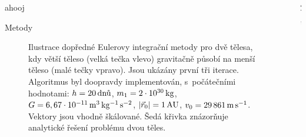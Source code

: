 \documentclass{beamer}
\newlength{\sep}
\newlength{\vyskaA}
\newlength{\side}
\begin{document}
\begin{frame}
\begin{columns}[t]
\begin{column}{\side}
	\vspace{\sep}

\begin{tcolorbox}
ahooj
\end{tcolorbox}
	\begin{minipage}[t][0.5\vyskaA][t]{\textwidth}
		\begin{block}{Metody\phantom{Úy}}
			\begin{figure}[!htb]
				\centering 
				{\Huge {}}
				\caption{Ilustrace dopředné Eulerovy integrační metody pro dvě tělesa, kdy větší těleso (velká tečka vlevo) gravitačně působí na menší těleso (malé tečky vpravo). Jsou ukázány první tři iterace. Algoritmus byl doopravdy implementován, s~počátečními hodnotami: $h=20\,{\rm \text{dnů}}$, $m_1=2\cdot10^{30}\,{\rm kg}$, $G=6,67\cdot10^{-11}\,{\rm m^3\,kg^{-1}\,s^{-2}}$, $|\vec{r}_0|=1\,{\rm AU}$, $v_0=29\,861\,{\rm m\,s^{-1}}$. Vektory jsou vhodně škálované. Šedá křivka znázorňuje analytické řešení problému dvou těles.} \label{fig:euler}
			\end{figure}
		\end{block}
	\end{minipage}

	\vspace{\sep}

\end{column}

\begin{column}{2\sep}
\end{column}


\end{columns}
\end{frame}
\end{document}
